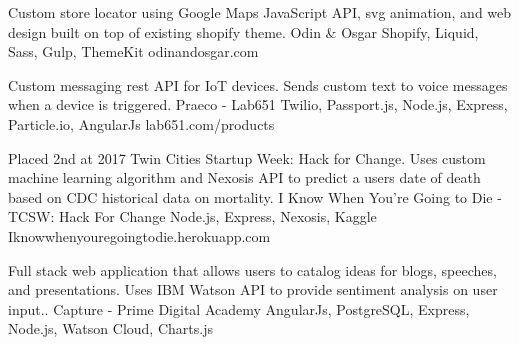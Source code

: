 \documentclass[]{awesome-cv}
\begin{document}
\vspace{-7mm}
\begin{cventries}
	\cventry
	{Custom store locator using Google Maps JavaScript API, svg animation, and web design built on top of existing shopify theme.}
	{Odin \& Osgar}
	{Shopify, Liquid, Sass, Gulp, ThemeKit}
	{odinandosgar.com}
	{}
	
	\vspace{-5mm}
	\cventry
	{Custom messaging rest API for IoT devices. Sends custom text to voice messages when a device is triggered.}
	{Praeco - Lab651}
	{Twilio, Passport.js, Node.js, Express, Particle.io, AngularJs}
	{lab651.com/products}
	{}
	
	\vspace{-5mm}
	\cventry
	{Placed 2nd at 2017 Twin Cities Startup Week: Hack for Change. Uses custom machine learning algorithm and Nexosis API to predict a users date of death based on CDC historical data on mortality.}
	{I Know When You’re Going to Die - TCSW: Hack For Change}
	{Node.js, Express, Nexosis, Kaggle}
	{Iknowwhenyouregoingtodie.herokuapp.com}
	{}
	
	\vspace{-5mm}
	\cventry
	{Full stack web application that allows users to catalog ideas for blogs, speeches, and presentations. Uses IBM Watson API to provide sentiment analysis on user input..}
	{Capture - Prime Digital Academy}
	{AngularJs, PostgreSQL, Express, Node.js, Watson Cloud, Charts.js}
	{}
	{}
	
	\vspace{-5mm}
\end{cventries}
\end{document}
